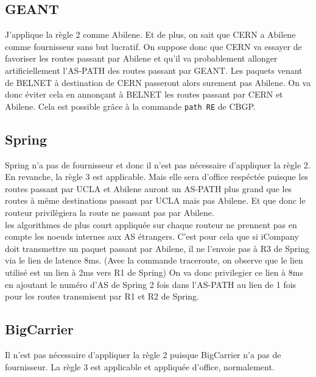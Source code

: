 \documentclass[a4paper, 12pt]{article}
\begin{document}
\subsection{GEANT}
J'applique la règle 2 comme Abilene.
Et de plus, on sait que CERN a Abilene comme fournisseur sans but lucratif.
On suppose donc que CERN va essayer de favoriser les routes passant par Abilene et qu'il va probablement allonger artificiellement l'AS-PATH des routes passant par GEANT.
Les paquets venant de BELNET à destination de CERN passeront alors surement pas Abilene.
On va donc éviter cela en annonçant à BELNET les routes passant par CERN et Abilene.
Cela est possible grâce à la commande \texttt{path RE} de CBGP.

\subsection{Spring}
Spring n'a pas de fournisseur et donc il n'est pas nécessaire d'appliquer la règle 2.
\\

En revanche, la règle 3 est applicable.
Mais elle sera d'office respéctée puisque les routes passant par UCLA et Abilene auront un AS-PATH plus grand que les routes à même destinations passant par UCLA mais pas Abilene.
Et que donc le routeur privilègiera la route ne passant pas par Abilene.
\\

les algorithmes de plus court appliquée sur chaque routeur ne prennent pas en compte les noeuds internes aux AS étrangers.
C'est pour cela que si iCompany doit transmettre un paquet passant par Abilene, il ne l'envoie pas à R3 de Spring via le lien de latence 8ms.
(Avec la commande traceroute, on observe que le lien utilisé est un lien à 2ms vers R1 de Spring)
On va donc privilegier ce lien à 8ms en ajoutant le numéro d'AS de Spring 2 fois dans l'AS-PATH au lien de 1 fois pour les routes transmisent par R1 et R2 de Spring.

\subsection{BigCarrier}
Il n'est pas nécessaire d'appliquer la règle 2 puisque BigCarrier n'a pas de fournisseur.
La règle 3 est applicable et appliquée d'office, normalement.
\end{document}
